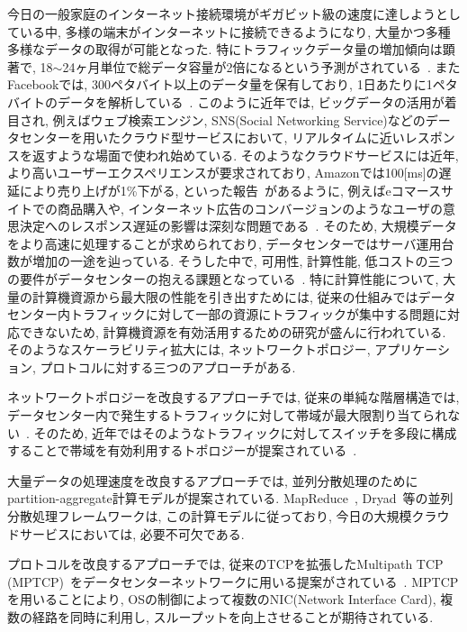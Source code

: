 \documentclass[11pt, a4paper, twocolumn]{jsarticle}
\begin{document}
今日の一般家庭のインターネット接続環境がギガビット級の速度に達しようとしている中, 多様の端末がインターネットに接続できるようになり,
大量かつ多種多様なデータの取得が可能となった.
特にトラフィックデータ量の増加傾向は顕著で, 18$\sim$24ヶ月単位で総データ容量が2倍になるという予測がされている~\cite{IBM_rep}.
またFacebookでは, 300ペタバイト以上のデータ量を保有しており, 1日あたりに1ペタバイトのデータを解析している~\cite{presto}.
このように近年では, ビッグデータの活用が着目され, 例えばウェブ検索エンジン, SNS(Social Networking
Service)などのデータセンターを用いたクラウド型サービスにおいて, リアルタイムに近いレスポンスを返すような場面で使われ始めている.
そのようなクラウドサービスには近年, より高いユーザーエクスペリエンスが要求されており,
Amazonでは100[ms]の遅延により売り上げが1\%下がる, といった報告~\cite{amazon}があるように,
例えばeコマースサイトでの商品購入や,
インターネット広告のコンバージョンのようなユーザの意思決定へのレスポンス遅延の影響は深刻な問題である~\cite{customer_impact}.
そのため, 大規模データをより高速に処理することが求められており, データセンターではサーバ運用台数が増加の一途を辿っている.
そうした中で, 可用性, 計算性能, 低コストの三つの要件がデータセンターの抱える課題となっている~\cite{requirement}.
特に計算性能について, 大量の計算機資源から最大限の性能を引き出すためには,
従来の仕組みではデータセンター内トラフィックに対して一部の資源にトラフィックが集中する問題に対応できないため,
計算機資源を有効活用するための研究が盛んに行われている\cite{mapreduce, dryad, fattree, bcube, vl2,
dctcp, improving, detail, p_fab}.
そのようなスケーラビリティ拡大には, ネットワークトポロジー, アプリケーション, プロトコルに対する三つのアプローチがある.

ネットワークトポロジーを改良するアプローチでは, 従来の単純な階層構造では,
データセンター内で発生するトラフィックに対して帯域が最大限割り当てられない~\cite{fattree}.
そのため, 近年ではそのようなトラフィックに対してスイッチを多段に構成することで帯域を有効利用するトポロジーが提案されている~\cite{fattree,
bcube, vl2}.

大量データの処理速度を改良するアプローチでは,
並列分散処理のためにpartition-aggregate計算モデルが提案されている.
MapReduce~\cite{mapreduce}, Dryad~\cite{dryad}等の並列分散処理フレームワークは,
この計算モデルに従っており, 今日の大規模クラウドサービスにおいては, 必要不可欠である.

プロトコルを改良するアプローチでは,
従来のTCPを拡張したMultipath TCP
(MPTCP)~\cite{mptcp}をデータセンターネットワークに用いる提案がされている~\cite{fattree,bcube,vl2}.
MPTCPを用いることにより, OSの制御によって複数のNIC(Network Interface Card), 複数の経路を同時に利用し,
スループットを向上させることが期待されている.
\end{document}

